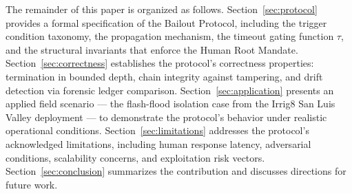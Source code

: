 The remainder of this paper is organized as follows. Section~\ref{sec:protocol} provides a formal specification of the Bailout Protocol, including the trigger condition taxonomy, the propagation mechanism, the timeout gating function $\tau$, and the structural invariants that enforce the Human Root Mandate. Section~\ref{sec:correctness} establishes the protocol's correctness properties: termination in bounded depth, chain integrity against tampering, and drift detection via forensic ledger comparison. Section~\ref{sec:application} presents an applied field scenario — the flash-flood isolation case from the Irrig8 San Luis Valley deployment — to demonstrate the protocol's behavior under realistic operational conditions. Section~\ref{sec:limitations} addresses the protocol's acknowledged limitations, including human response latency, adversarial conditions, scalability concerns, and exploitation risk vectors. Section~\ref{sec:conclusion} summarizes the contribution and discusses directions for future work.
